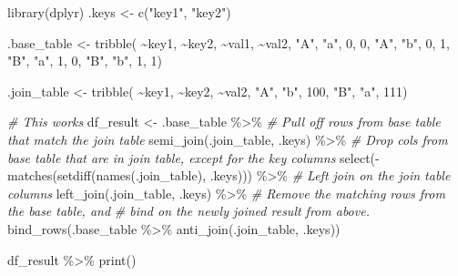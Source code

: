 \documentclass[
]{book}
\newenvironment{Shaded}{\begin{snugshade}}{\end{snugshade}}
\newcommand{\CommentTok}[1]{\textcolor[rgb]{0.56,0.35,0.01}{\textit{#1}}}
\newcommand{\DecValTok}[1]{\textcolor[rgb]{0.00,0.00,0.81}{#1}}
\newcommand{\FunctionTok}[1]{\textcolor[rgb]{0.00,0.00,0.00}{#1}}
\newcommand{\NormalTok}[1]{#1}
\newcommand{\OtherTok}[1]{\textcolor[rgb]{0.56,0.35,0.01}{#1}}
\newcommand{\SpecialCharTok}[1]{\textcolor[rgb]{0.00,0.00,0.00}{#1}}
\newcommand{\StringTok}[1]{\textcolor[rgb]{0.31,0.60,0.02}{#1}}
\begin{document}
\begin{Shaded}
\begin{Highlighting}[]
\FunctionTok{library}\NormalTok{(dplyr)}
\NormalTok{.keys }\OtherTok{\textless{}{-}} \FunctionTok{c}\NormalTok{(}\StringTok{"key1"}\NormalTok{, }\StringTok{"key2"}\NormalTok{)}

\NormalTok{.base\_table }\OtherTok{\textless{}{-}} \FunctionTok{tribble}\NormalTok{(}
    \SpecialCharTok{\textasciitilde{}}\NormalTok{key1, }\SpecialCharTok{\textasciitilde{}}\NormalTok{key2, }\SpecialCharTok{\textasciitilde{}}\NormalTok{val1, }\SpecialCharTok{\textasciitilde{}}\NormalTok{val2,}
    \StringTok{"A"}\NormalTok{, }\StringTok{"a"}\NormalTok{, }\DecValTok{0}\NormalTok{, }\DecValTok{0}\NormalTok{,}
    \StringTok{"A"}\NormalTok{, }\StringTok{"b"}\NormalTok{, }\DecValTok{0}\NormalTok{, }\DecValTok{1}\NormalTok{,}
    \StringTok{"B"}\NormalTok{, }\StringTok{"a"}\NormalTok{, }\DecValTok{1}\NormalTok{, }\DecValTok{0}\NormalTok{,}
    \StringTok{"B"}\NormalTok{, }\StringTok{"b"}\NormalTok{, }\DecValTok{1}\NormalTok{, }\DecValTok{1}\NormalTok{)}

\NormalTok{.join\_table }\OtherTok{\textless{}{-}} \FunctionTok{tribble}\NormalTok{(}
    \SpecialCharTok{\textasciitilde{}}\NormalTok{key1, }\SpecialCharTok{\textasciitilde{}}\NormalTok{key2, }\SpecialCharTok{\textasciitilde{}}\NormalTok{val2,}
    \StringTok{"A"}\NormalTok{, }\StringTok{"b"}\NormalTok{, }\DecValTok{100}\NormalTok{,}
    \StringTok{"B"}\NormalTok{, }\StringTok{"a"}\NormalTok{, }\DecValTok{111}\NormalTok{)}

\CommentTok{\# This works}
\NormalTok{df\_result }\OtherTok{\textless{}{-}}\NormalTok{ .base\_table }\SpecialCharTok{\%\textgreater{}\%}
    \CommentTok{\# Pull off rows from base table that match the join table}
    \FunctionTok{semi\_join}\NormalTok{(.join\_table, .keys) }\SpecialCharTok{\%\textgreater{}\%}
    \CommentTok{\# Drop cols from base table that are in join table, except for the key columns}
    \FunctionTok{select}\NormalTok{(}\SpecialCharTok{{-}}\FunctionTok{matches}\NormalTok{(}\FunctionTok{setdiff}\NormalTok{(}\FunctionTok{names}\NormalTok{(.join\_table), .keys))) }\SpecialCharTok{\%\textgreater{}\%}
    \CommentTok{\# Left join on the join table columns}
    \FunctionTok{left\_join}\NormalTok{(.join\_table, .keys) }\SpecialCharTok{\%\textgreater{}\%}
    \CommentTok{\# Remove the matching rows from the base table, and }
    \CommentTok{\# bind on the newly joined result from above.}
    \FunctionTok{bind\_rows}\NormalTok{(.base\_table }\SpecialCharTok{\%\textgreater{}\%} \FunctionTok{anti\_join}\NormalTok{(.join\_table, .keys))}

\NormalTok{df\_result }\SpecialCharTok{\%\textgreater{}\%}
    \FunctionTok{print}\NormalTok{()}
\end{Highlighting}
\end{Shaded}
\end{document}
